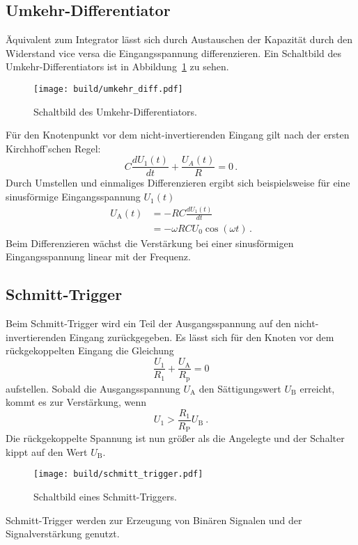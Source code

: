\subsection*{Umkehr-Differentiator}%
\label{sub:umkehr_differentiator}
Äquivalent zum Integrator lässt sich durch Austauschen der Kapazität durch
den Widerstand vice versa die Eingangsspannung differenzieren.
Ein Schaltbild des Umkehr-Differentiators ist in Abbildung~\ref{fig:diff} zu
sehen.
\begin{figure}[h]
		\centering
		\texttt{[image: build/umkehr\_diff.pdf]}
		\caption{Schaltbild des Umkehr-Differentiators.\cite{anleitung}}
		\label{fig:diff}
\end{figure}
Für den Knotenpunkt vor dem nicht-invertierenden Eingang gilt nach der ersten
Kirchhoff'schen Regel:
\begin{equation}
		C \frac{d U_1(t)}{dt} + \frac{U_A(t)}{R} = 0 \, .
\end{equation}
Durch Umstellen und einmaliges Differenzieren ergibt sich beispielsweise für
eine sinusförmige Eingangsspannung $U_1(t)$
\begin{align}
		U_\text{A}(t) &= - RC \frac{dU_1(t)}{dt} \nonumber \\
                  &= - \omega R C U_0 \cos(\omega t) \label{eq:differentiator} \, .
\end{align}
Beim Differenzieren wächst die Verstärkung bei einer sinusförmigen
Eingangsspannung linear mit der Frequenz.

\subsection{Schmitt-Trigger}%
\label{sub:schmitt_trigger}

Beim Schmitt-Trigger wird ein Teil der Ausgangsspannung auf den
nicht-invertierenden Eingang zurückgegeben.
Es lässt sich für den Knoten vor dem rückgekoppelten Eingang die Gleichung
\begin{equation}
		\frac{U_1}{R_1} + \frac{U_\text{A}}{R_\text{p}} = 0
\end{equation}
aufstellen.
Sobald die Ausgangsspannung $U_\text{A}$ den Sättigungswert $U_\text{B}$ erreicht,
kommt es zur Verstärkung, wenn
\begin{equation}
		\label{eq:schmitt}
		U_1 > \frac{R_1}{R_\text{P}} U_\text{B} \ .
\end{equation}
Die rückgekoppelte Spannung ist nun größer als die Angelegte und der Schalter
kippt auf den Wert $U_\text{B}$.
\begin{figure}[h]
		\centering
		\texttt{[image: build/schmitt\_trigger.pdf]}
		\caption{Schaltbild eines Schmitt-Triggers. \cite{anleitung}}
		\label{fig:}
\end{figure}
Schmitt-Trigger werden zur Erzeugung von Binären Signalen und der
Signalverstärkung genutzt.

